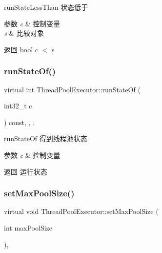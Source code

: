 run\+State\+Less\+Than 状态低于 


\begin{DoxyParams}{参数}
{\em c} & 控制变量 \\
\hline
{\em s} & 比较对象\\
\hline
\end{DoxyParams}
\begin{DoxyReturn}{返回}
bool c $<$ s 
\end{DoxyReturn}
\mbox{\label{classThreadPoolExecutor_acdb626fdcb6ed4c7822508d1e0a3fcf5}} 
\subsubsection{\texorpdfstring{run\+State\+Of()}{runStateOf()}}
{\footnotesize\ttfamily virtual int Thread\+Pool\+Executor\+::run\+State\+Of (\begin{DoxyParamCaption}\item[{int32\+\_\+t}]{c }\end{DoxyParamCaption}) const\hspace{0.3cm}{\ttfamily [inline]}, {\ttfamily [final]}, {\ttfamily [protected]}, {\ttfamily [virtual]}}



run\+State\+Of 得到线程池状态 


\begin{DoxyParams}{参数}
{\em c} & 控制变量\\
\hline
\end{DoxyParams}
\begin{DoxyReturn}{返回}
运行状态 
\end{DoxyReturn}
\mbox{\label{classThreadPoolExecutor_ac5a10d336958ca43530b31bff81c9c4b}} 
\subsubsection{\texorpdfstring{set\+Max\+Pool\+Size()}{setMaxPoolSize()}}
{\footnotesize\ttfamily virtual void Thread\+Pool\+Executor\+::set\+Max\+Pool\+Size (\begin{DoxyParamCaption}\item[{int}]{max\+Pool\+Size }\end{DoxyParamCaption})\hspace{0.3cm}{\ttfamily [final]}, {\ttfamily [virtual]}}




